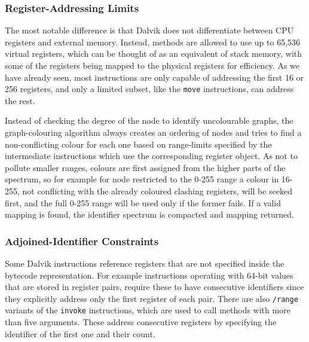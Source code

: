 \documentclass[12pt,twoside,notitlepage]{report}
\begin{document}
\subsubsection{Register-Addressing Limits}

The most notable difference is that Dalvik does not differentiate between CPU registers and external memory. Instead, methods are allowed to use up to 65,536 virtual registers, which can be thought of as an equivalent of stack memory, with some of the registers being mapped to the physical registers for efficiency. As we have already seen, most instructions are only capable of addressing the first 16 or 256 registers, and only a limited subset, like the \verb$move$ instructions, can address the rest. 

Instead of checking the degree of the node to identify uncolourable graphs, the graph-colouring algorithm always creates an ordering of nodes and tries to find a non-conflicting colour for each one based on range-limits specified by the intermediate instructions which use the corresponding register object. As not to pollute smaller ranges, colours are first assigned from the higher parts of the spectrum, so for example for node restricted to the 0-255 range a colour in 16-255, not conflicting with the already coloured clashing registers, will be seeked first, and the full 0-255 range will be used only if the former fails. If a valid mapping is found, the identifier spectrum is compacted and mapping returned.

\subsubsection{Adjoined-Identifier Constraints}

Some Dalvik instructions reference registers that are not specified inside the bytecode representation. For example instructions operating with 64-bit values that are stored in register pairs, require these to have consecutive identifiers since they explicitly address only the first register of each pair. There are also \verb$/range$ variants of the \verb$invoke$ instructions, which are used to call methods with more than five arguments. These address consecutive registers by specifying the identifier of the first one and their count.
\end{document}
